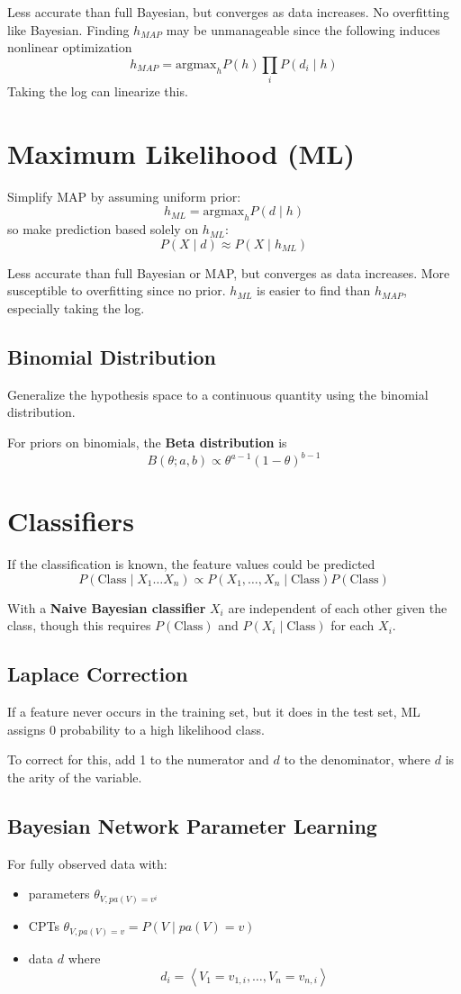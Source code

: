\documentclass[11pt]{article}
\begin{document}
Less accurate than full Bayesian, but converges as data increases.
No overfitting like Bayesian.
Finding \(h_{MAP}\) may be unmanageable since the following induces nonlinear
optimization
$$ h_{MAP} = \text{argmax}_{h} P(h) \prod_{i} P(d_{i} \mid h) $$
Taking the log can linearize this.
\section{Maximum Likelihood (ML)}
\label{sec:org1b68a09}
Simplify MAP by assuming uniform prior:
$$ h_{ML} = \text{argmax}_{h} P(d \mid h) $$
so make prediction based solely on \(h_{ML}\):
$$ P(X \mid d) \approx P(X \mid h_{ML}) $$

Less accurate than full Bayesian or MAP, but converges as data increases.
More susceptible to overfitting since no prior.
\(h_{ML}\) is easier to find than \(h_{MAP}\), especially taking the log.
\subsection{Binomial Distribution}
\label{sec:org4c480d3}
Generalize the hypothesis space to a continuous quantity using the
binomial distribution.

For priors on binomials, the \textbf{Beta distribution} is
$$ B(\theta ; a, b) \propto \theta^{a-1}(1-\theta)^{b-1} $$
\section{Classifiers}
\label{sec:org8f29205}
If the classification is known, the feature values could be predicted
$$ P(\text{Class} \mid X_{1} \dots X_{n}) \propto P(X_{1}, \dots, X_{n} \mid \text{Class}) P(\text{Class}) $$

With a \textbf{Naive Bayesian classifier} \(X_{i}\) are independent of each other given the class,
though this requires \(P(\text{Class})\) and \(P(X_{i} \mid \text{Class})\) for each \(X_{i}\).
\subsection{Laplace Correction}
\label{sec:orge14cc00}
If a feature never occurs in the training set, but it does in the test set, ML
assigns 0 probability to a high likelihood class.

To correct for this, add 1 to the numerator and \(d\) to the denominator, where \(d\)
is the arity of the variable.
\subsection{Bayesian Network Parameter Learning}
\label{sec:orgf899c48}
For fully observed data with:
\begin{itemize}
\item parameters \(\theta_{V, pa(V) = v^{i}}\)
\item CPTs \(\theta_{V, pa(V) = v} = P(V \mid pa(V) = v)\)
\item data \(d\) where
$$ d_{i} = \left< V_{1} = v_{1, i}, \dots, V_{n} = v_{n, i} \right> $$
\end{itemize}
\end{document}
